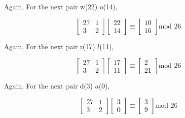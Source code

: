 \documentclass[a4paper,12pt]{article}
\begin{document}
    \begin{center}
    \end{center}

    Again, For the next pair w(22) o(14),

    \begin{equation*}
        \begin{bmatrix}
            27 & 1 \\
            3 & 2
        \end{bmatrix}
        \begin{bmatrix}
            22 \\
            14
        \end{bmatrix} \equiv \begin{bmatrix}
            10 \\
            16
        \end{bmatrix} \mbox{mod 26}
    \end{equation*}

    \begin{center}
    \end{center}

    Again, For the next pair r(17) $l$(11),

    \begin{equation*}
        \begin{bmatrix}
            27 & 1 \\
            3 & 2
        \end{bmatrix}
        \begin{bmatrix}
            17 \\
            11
        \end{bmatrix} \equiv \begin{bmatrix}
            2 \\
            21
        \end{bmatrix} \mbox{mod 26}
    \end{equation*}

    \begin{center}
    \end{center}

    Again, For the next pair d(3) $a$(0),

    \begin{equation*}
        \begin{bmatrix}
            27 & 1 \\
            3 & 2
        \end{bmatrix}
        \begin{bmatrix}
            3 \\
            0
        \end{bmatrix} \equiv \begin{bmatrix}
            3 \\
            9
        \end{bmatrix} \mbox{mod 26}
    \end{equation*}
\end{document}
